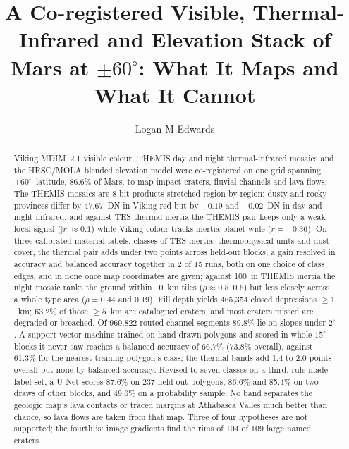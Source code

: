 \documentclass[twocolumn]{aastex701}
\newcommand{\pmsixty}{$\pm60^{\circ}$}
\begin{document}
\title{A Co-registered Visible, Thermal-Infrared and Elevation Stack of Mars at $\pm60^{\circ}$: What It Maps and What It Cannot}

\author{Logan M Edwards}

\begin{abstract}
Viking MDIM~2.1 visible colour, THEMIS day and night thermal-infrared mosaics and the HRSC/MOLA blended elevation
model were co-registered on one grid spanning \pmsixty\ latitude, 86.6\% of Mars, to map impact craters, fluvial
channels and lava flows. The THEMIS mosaics are 8-bit products stretched region by region: dusty and rocky provinces
differ by 47.67~DN in Viking red but by $-0.19$ and $+0.02$~DN in day and night infrared, and against TES
thermal inertia the THEMIS pair keeps only a weak local signal ($|r|\approx0.1$) while Viking colour tracks inertia
planet-wide ($r=-0.36$). On three calibrated material labels, classes of TES inertia, thermophysical units and
dust cover, the thermal pair adds under two points across held-out blocks, a gain resolved in accuracy and balanced
accuracy together in 2 of 15 runs, both on one choice of class edges, and in none once map coordinates are given;
against 100~m THEMIS inertia the night mosaic ranks the ground within 10~km tiles ($\rho\approx0.5$--0.6) but less
closely across a whole type area ($\rho=0.44$ and 0.19). Fill depth yields 465,354 closed depressions $\ge1$~km; 63.2\% of those $\ge5$~km are
catalogued craters, and most craters missed are degraded or breached. Of 969,822 routed channel segments 89.8\%
lie on slopes under $2^{\circ}$. A support vector machine trained on hand-drawn polygons and scored in whole
$15^{\circ}$ blocks it never saw reaches a balanced accuracy of 66.7\% (73.8\% overall), against 61.3\% for the nearest
training polygon's class; the thermal bands add 1.4 to 2.0 points overall but none by balanced accuracy. Revised to
seven classes on a third, rule-made label set, a U-Net scores 87.6\% on 237 held-out polygons, 86.6\% and 85.4\% on two
draws of other blocks, and 49.6\% on a probability sample. No band separates the geologic map's lava contacts or traced margins at Athabasca Valles much better than chance, so lava flows are taken from that map. Three of four hypotheses are not
supported; the fourth is: image gradients find the rims of 104 of 109 large named craters.
\end{abstract}

\end{document}
